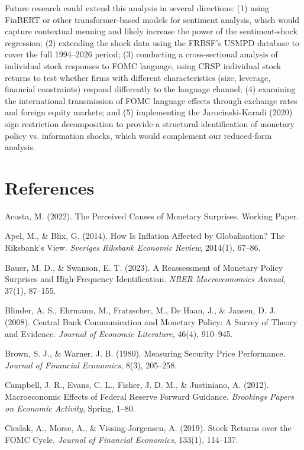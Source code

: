 Future research could extend this analysis in several directions: (1) using FinBERT or other transformer-based models for sentiment analysis, which would capture contextual meaning and likely increase the power of the sentiment-shock regression; (2) extending the shock data using the FRBSF's USMPD database to cover the full 1994--2026 period; (3) conducting a cross-sectional analysis of individual stock responses to FOMC language, using CRSP individual stock returns to test whether firms with different characteristics (size, leverage, financial constraints) respond differently to the language channel; (4) examining the international transmission of FOMC language effects through exchange rates and foreign equity markets; and (5) implementing the Jarocinski-Karadi (2020) sign restriction decomposition to provide a structural identification of monetary policy vs. information shocks, which would complement our reduced-form analysis.


\section{References}

Acosta, M. (2022). The Perceived Causes of Monetary Surprises. Working Paper.

Apel, M., \& Blix, G. (2014). How Is Inflation Affected by Globalisation? The Riksbank's View. \textit{Sveriges Riksbank Economic Review}, 2014(1), 67--86.

Bauer, M. D., \& Swanson, E. T. (2023). A Reassessment of Monetary Policy Surprises and High-Frequency Identification. \textit{NBER Macroeconomics Annual}, 37(1), 87--155.

Blinder, A. S., Ehrmann, M., Fratzscher, M., De Haan, J., \& Jansen, D. J. (2008). Central Bank Communication and Monetary Policy: A Survey of Theory and Evidence. \textit{Journal of Economic Literature}, 46(4), 910--945.

Brown, S. J., \& Warner, J. B. (1980). Measuring Security Price Performance. \textit{Journal of Financial Economics}, 8(3), 205--258.

Campbell, J. R., Evans, C. L., Fisher, J. D. M., \& Justiniano, A. (2012). Macroeconomic Effects of Federal Reserve Forward Guidance. \textit{Brookings Papers on Economic Activity}, Spring, 1--80.

Cieslak, A., Morse, A., \& Vissing-Jorgensen, A. (2019). Stock Returns over the FOMC Cycle. \textit{Journal of Financial Economics}, 133(1), 114--137.

